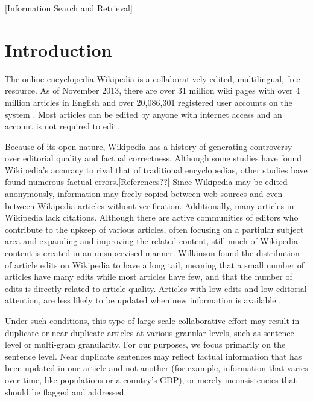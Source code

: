 \documentclass{acm_proc_article-sp}
\begin{document}
[Information Search and Retrieval]


\section{Introduction}
The online encyclopedia Wikipedia is a collaboratively edited, multilingual, free resource. As of November 2013, there are over 31 million wiki pages with over 4 million articles in English and over 20,086,301 registered user accounts on the system \cite{wiki:weblink}. Most articles can be edited by anyone with internet access and an account is not required to edit.

Because of its open nature, Wikipedia has a history of generating controversy over editorial quality and factual correctness. Although some studies have found Wikipedia's accuracy to rival that of traditional encyclopedias, other studies have found numerous factual errors.[References??] Since Wikipedia may be edited anonymously, information may freely copied between web sources and even between Wikipedia articles without verification. Additionally, many articles in Wikipedia lack citations. Although there are active communities of editors who contribute to the upkeep of various articles, often focusing on a partiular subject area and expanding and improving the related content, still much of Wikipedia content is created in an unsupervised manner. Wilkinson found the distribution of article edits on Wikipedia to have a long tail, meaning that a small number of articles have many edits while most articles have few, and that the number of edits is directly related to article quality. Articles with low edits and low editorial attention, are less likely to be updated when new information is available \cite{wilkinson:wiki}.

Under such conditions, this type of large-scale collaborative effort may result in duplicate or near duplicate articles at various granular levels, such as sentence-level or multi-gram granularity. For our purposes, we focus primarily on the sentence level. Near duplicate sentences may reflect factual information that has been updated in one article and not another (for example, information that varies over time, like populations or a country's GDP), or merely inconsistencies that should be flagged and addressed. 
\end{document}
